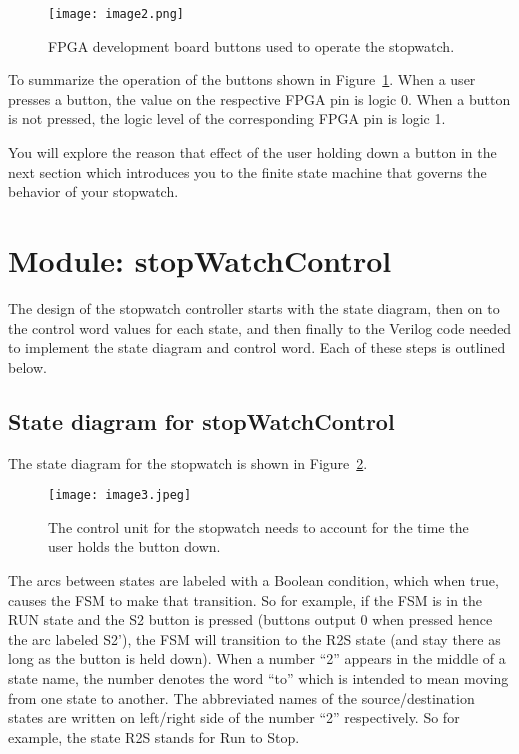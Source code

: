 \begin{figure}[ht]
\texttt{[image: image2.png]}
\caption{FPGA development board buttons used to operate the stopwatch.}
\label{fig:swCuButtons}
\end{figure}

To summarize the operation of the buttons shown in Figure~\ref{fig:swCuButtons}. When a user
presses a button, the value on the respective FPGA pin is logic 0. When
a button is not pressed, the logic level of the corresponding FPGA pin
is logic 1.

You will explore the reason that effect of the user holding down a
button in the next section which introduces you to the finite state
machine that governs the behavior of your stopwatch.

\section{Module: stopWatchControl}
The design of the stopwatch controller starts with the state diagram, then
on to the control word values for each state, and then finally to the 
Verilog code needed to implement the state diagram and control 
word.  Each of these steps is outlined below.

\subsection{State diagram for stopWatchControl}
The state diagram for the stopwatch is shown in Figure~\ref{fig:swCuStateDiagram}.

\begin{figure}[ht]
\texttt{[image: image3.jpeg]}
\caption{The control unit for the stopwatch needs to account for the
time the user holds the button down.}
\label{fig:swCuStateDiagram}
\end{figure}

The arcs between states are labeled with a Boolean condition, which when
true, causes the FSM to make that transition. So for example, if the FSM
is in the RUN state and the S2 button is pressed (buttons output 0 when
pressed hence the arc labeled S2'), the FSM will transition to the R2S
state (and stay there as long as the button is held down). When a number
``2'' appears in the middle of a state name, the number denotes the word
``to'' which is intended to mean moving from one state to another. The
abbreviated names of the source/destination states are written on
left/right side of the number ``2'' respectively. So for example, the
state R2S stands for Run to Stop.

